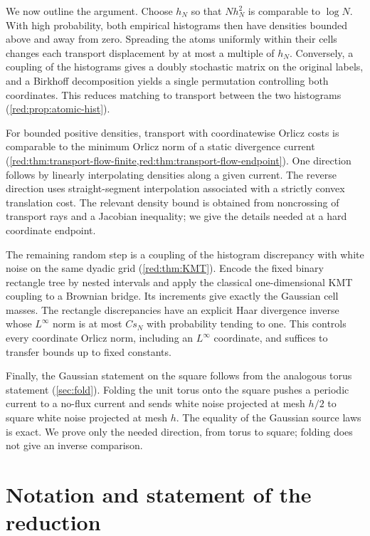 \documentclass[11pt]{article}
\theoremstyle{definition}
\theoremstyle{remark}
\numberwithin{equation}{section}
\begin{document}
We now outline the argument. Choose $h_N$ so that $Nh_N^2$ is comparable
to $\log N$. With high probability, both empirical histograms then have
densities bounded above and away from zero. Spreading the atoms uniformly
within their cells changes each transport displacement by at most a
multiple of $h_N$. Conversely, a coupling of the histograms gives a doubly
stochastic matrix on the original labels, and a Birkhoff decomposition
yields a single permutation controlling both coordinates. This reduces
matching to transport between the two histograms
(\cref{red:prop:atomic-hist}).

For bounded positive densities, transport with coordinatewise Orlicz
costs is comparable to the minimum Orlicz norm of a static divergence
current (\cref{red:thm:transport-flow-finite,red:thm:transport-flow-endpoint}).
One direction follows by linearly interpolating densities along
a given current. The reverse direction uses straight-segment interpolation
associated with a strictly convex translation cost. The relevant density
bound is obtained from noncrossing of transport rays and a Jacobian
inequality; we give the details needed at a hard coordinate endpoint.

The remaining random step is a coupling of the histogram discrepancy with
white noise on the same dyadic grid (\cref{red:thm:KMT}). Encode the fixed
binary rectangle tree by nested intervals and apply the classical
one-dimensional KMT coupling to a Brownian bridge. Its increments give
exactly the Gaussian cell masses. The rectangle discrepancies have an
explicit Haar divergence inverse whose $L^\infty$ norm is at most $Cs_N$
with probability tending to one. This controls every coordinate
Orlicz norm, including an $L^\infty$ coordinate, and suffices to
transfer bounds up to fixed constants.

Finally, the Gaussian statement on the square follows from the analogous
torus statement (\cref{sec:fold}). Folding the unit torus onto the square
pushes a periodic current to a no-flux current and sends white noise
projected at mesh $h/2$ to square white noise projected at mesh $h$.
The equality of the Gaussian source laws is exact. We prove only the
needed direction, from torus to square; folding does not give an inverse
comparison.

\section{Notation and statement of the reduction}\label{red:sec:matching}
\end{document}
